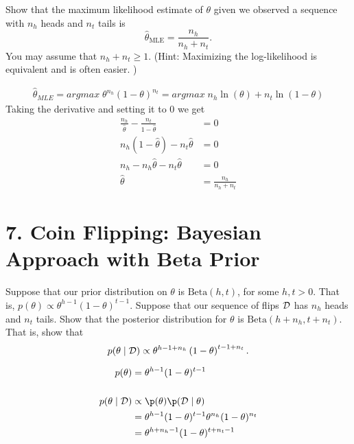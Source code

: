 \documentclass[12pt,letterpaper]{article}
\begin{document}
\begin{problem}{6.4}
    Show that the maximum likelihood estimate of $\theta$
    given we observed a sequence with $n_{h}$ heads and $n_{t}$ tails
    is
    \[
    \hat{\theta}_{\text{MLE}}=\frac{n_{h}}{n_{h}+n_{t}}.
    \]
    You may assume that $n_{h}+n_{t}\ge1$. (Hint: Maximizing the log-likelihood
    is equivalent and is often easier. )
\end{problem}
\begin{solution}{}
    \begin{align*}
        \hat{\theta}_{MLE} = argmax\; \theta^{n_h}(1-\theta)^{n_t} = argmax\; n_h\ln(\theta) + n_t\ln(1-\theta)
    \end{align*}
    Taking the derivative and setting it to 0 we get
    \begin{align*}
        \frac{n_h}{\hat{\theta}} - \frac{n_t}{1-\hat{\theta}} &= 0\\
        n_h(1-\hat{\theta}) - n_t\hat{\theta} &= 0\\
        n_h - n_h\hat{\theta} - n_t\hat{\theta} &= 0\\
        \hat{\theta} &= \frac{n_h}{n_h+n_t}
    \end{align*}
\end{solution}
\newpage

\section*{7. Coin Flipping: Bayesian Approach with Beta Prior}
\begin{problem}{7.1}
    Suppose that our prior distribution on $\theta$ is
    $\mbox{Beta}(h,t)$, for some $h,t>0$. That is, $p(\theta)\propto\theta^{h-1}\left(1-\theta\right)^{t-1}$.
    Suppose that our sequence of flips $\mathcal{D}$ has $n_{h}$ heads and $n_{t}$
    tails. Show that the posterior distribution for $\theta$ is $\mbox{Beta}(h+n_{h},t+n_{t})$.
    That is, show that
    \[
    p(\theta\mid\mathcal{D})\propto\theta^{h-1+n_{h}}\left(1-\theta\right)^{t-1+n_{t}}.
    \]
\end{problem}
\begin{solution}{}
    \begin{align*}
        p(\theta) &= \theta^{h-1}(1-\theta)^{t-1}\\
        \\
        p(\theta\mid\cd) &\propto \p(\theta)\p(\cd\mid\theta)\\
        &= \theta^{h-1}(1-\theta)^{t-1}\theta^{n_h}(1-\theta)^{n_t}\\
        &= \theta^{h+n_h-1}(1-\theta)^{t+n_t-1}
    \end{align*}
\end{solution}
\newpage
\end{document}
